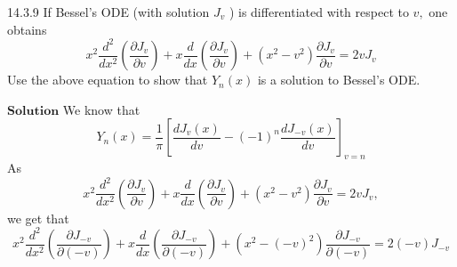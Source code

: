 \newpage



\begin{mybox}{14.3.9}
If Bessel's ODE (with solution $J_{v}$ ) is differentiated with respect to $v,$ one obtains
$$
x^{2} \frac{d^{2}}{d x^{2}}\left(\frac{\partial J_{v}}{\partial v}\right)+x \frac{d}{d x}\left(\frac{\partial J_{v}}{\partial v}\right)+\left(x^{2}-v^{2}\right) \frac{\partial J_{v}}{\partial v}=2 v J_{v}
$$
Use the above equation to show that $Y_{n}(x)$ is a solution to Bessel's ODE.

\end{mybox}
$\boxed{\textbf{Solution}}$ We know that 
$$Y_{n}(x)=\frac{1}{\pi}\left[\frac{d J_{v}(x)}{d v}-(-1)^{n} \frac{d J_{-v}(x)}{d v}\right]_{v=n}$$
As 
$$x^{2} \frac{d^{2}}{d x^{2}}\left(\frac{\partial J_{v}}{\partial v}\right)+x \frac{d}{d x}\left(\frac{\partial J_{v}}{\partial v}\right)+\left(x^{2}-v^{2}\right) \frac{\partial J_{v}}{\partial v}=2 v J_{v},$$ 
we get that
$$x^{2} \frac{d^{2}}{d x^{2}}\left(\frac{\partial J_{-v}}{\partial(-v)}\right)+x \frac{d}{d x}\left(\frac{\partial J_{-v}}{\partial(-v)}\right)+\left(x^{2}-(-v)^{2}\right) \frac{\partial J_{-v}}{\partial(-v)}=2(-v) J_{-v}$$

